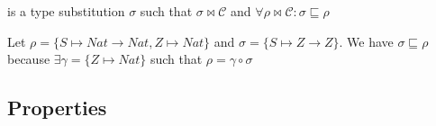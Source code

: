 \documentclass[8pt]{beamer}
\begin{document}
\begin{frame}
\begin{itemize}
                is a type substitution $\sigma$ such that $\sigma \Join \mathcal{C}$
                and $\forall \rho \Join \mathcal{C}: \sigma \sqsubseteq \rho$
    \end{itemize}
    \begin{example}
        Let $\rho = \{S \mapsto Nat \rightarrow Nat, Z \mapsto Nat\}$ 
        and $\sigma = \{S \mapsto Z \rightarrow Z\}$. We have $\sigma 
        \sqsubseteq \rho$ because $\exists \gamma = \{Z \mapsto Nat\}$ 
        such that $\rho = \gamma \circ \sigma$
    \end{example}
\end{frame}

\subsection{Properties}
\end{document}
